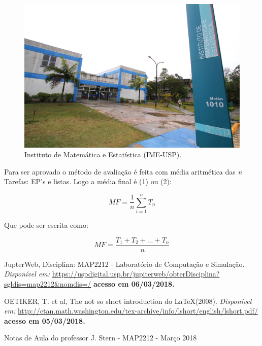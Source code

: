 \documentclass[12pt, a4paper]{article} %
\begin{document}
\begin{figure}[!htb] %
\centering %
\includegraphics[scale = 0.6]{IME.jpg} %
\caption{\label{fig:IME}Instituto de Matemática e Estatística (IME-USP).} %
\end{figure}

Para ser aprovado o método de avaliação é feita com média aritmética das \textit{n} Tarefas: EP's e listas. Logo a média final é (1) ou (2):

\begin{equation} %
MF = \frac{1}{n} \sum_{i=1}^{n} T_{n} %
\end{equation}

Que pode ser escrita como:

\begin{equation} %
MF = \frac{T_{1} + T_{2} + ... + T_{n}}{n}
\end{equation}

\begin{thebibliography}{refs} %
        JupterWeb, Disciplina: MAP2212 - Laboratório de Computação e Simulação.
        \textit{Disponível em:}
        \url{https://uspdigital.usp.br/jupiterweb/obterDisciplina?sgldis=map2212&nomdis=/}
        \textbf {acesso em 06/03/2018.}
        
        OETIKER, T. et al, The not so short introduction do \LaTeX (2008).
        \textit{Disponível em:}
        \url{http://ctan.math.washington.edu/tex-archive/info/lshort/english/lshort.pdf/}
        \textbf {acesso em 05/03/2018.}
        
        Notas de Aula do professor J. Stern - MAP2212 - Março 2018       
\end{thebibliography}
\end{document}

